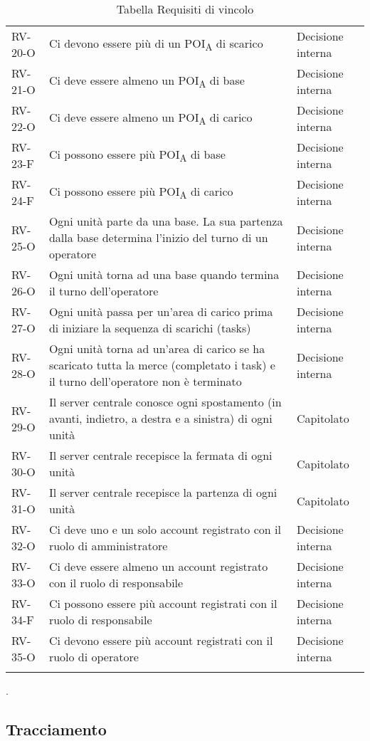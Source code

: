 \begin{longtable}{ 
		>{}p{} 
		>{}p{}
		>{\centering}p{} }
RV-20-O & Ci devono essere più di un POI\textsubscript{A} di scarico & Decisione interna\tabularnewline
RV-21-O & Ci deve essere almeno un POI\textsubscript{A} di base & Decisione interna\tabularnewline
RV-22-O & Ci deve essere almeno un POI\textsubscript{A} di carico & Decisione interna\tabularnewline
RV-23-F & Ci possono essere più POI\textsubscript{A} di base & Decisione interna\tabularnewline
RV-24-F & Ci possono essere più POI\textsubscript{A} di carico & Decisione interna\tabularnewline
RV-25-O & Ogni unità parte da una base. La sua partenza dalla base determina l'inizio del turno di un operatore & Decisione interna\tabularnewline
RV-26-O & Ogni unità torna ad una base quando termina il turno dell'operatore & Decisione interna\tabularnewline
RV-27-O & Ogni unità passa per un'area di carico prima di iniziare la sequenza di scarichi (tasks) & Decisione interna\tabularnewline
RV-28-O & Ogni unità torna ad un'area di carico se ha scaricato tutta la merce (completato i task) e il turno dell'operatore non è terminato & Decisione interna\tabularnewline
RV-29-O & Il server centrale conosce ogni spostamento (in avanti, indietro, a destra e a sinistra) di ogni unità & Capitolato\tabularnewline
RV-30-O & Il server centrale recepisce la fermata di ogni unità & Capitolato\tabularnewline
RV-31-O & Il server centrale recepisce la partenza di ogni unità & Capitolato\tabularnewline
RV-32-O	&	Ci deve uno e un solo account registrato con il ruolo di amministratore	&	Decisione interna	\tabularnewline
RV-33-O	&	Ci deve essere almeno un account registrato con il ruolo di responsabile	&	Decisione interna	\tabularnewline
RV-34-F	&	Ci possono essere più account registrati con il ruolo di responsabile	&	Decisione interna	\tabularnewline
RV-35-O	&	Ci devono essere più account registrati con il ruolo di operatore	&	Decisione interna	\tabularnewline
\caption{Tabella Requisiti di vincolo\label{ Tabella Requisiti di vincolo}}
\end{longtable}.
\pagebreak
\subsection{Tracciamento}
